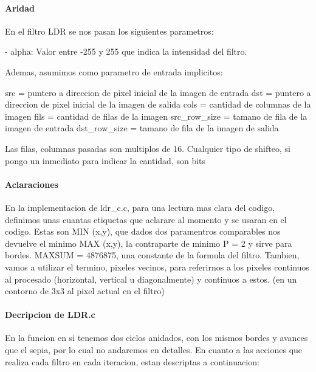 \documentclass[a4paper]{article}
\begin{document}
\paragraph{\textbf{Aridad}}
\hfill \break
En el filtro LDR se nos pasan los siguientes parametros:

- alpha: Valor entre -255 y 255 que indica la intensidad del filtro.

Ademas, asumimos como parametro de entrada implicitos:

src = puntero a direccion de pixel inicial de la imagen de entrada
\hfill \break
dst = puntero a direccion de pixel inicial de la imagen de salida
\hfill \break
cols = cantidad de columnas de la imagen
fils = cantidad de filas de la imagen
src_row_size = tamano de fila de la imagen de entrada
dst_row_size = tamano de fila de la imagen de salida 

Las filas, columnas pasadas son multiplos de 16. Cualquier tipo de shifteo, si pongo un inmediato para indicar la cantidad, son bits
 \paragraph{\textbf{Aclaraciones}}
\hfill \break	


	En la implementacion de ldr_c.c, para una lectura mas clara del codigo, definimos unas cuantas etiquetas que aclarare al momento y se usaran en el codigo. Estas son
	\hfill \break	
	MIN (x,y),  que dados dos paramentros comparables nos devuelve el minimo
	\hfill \break	
	MAX (x,y), la contraparte de minimo
	\hfill \break	
	P =  2 y sirve para bordes.
	\hfill \break	
	MAXSUM = 4876875, una constante de la formula del filtro.
	\hfill \break	
	Tambien, vamos a utilizar el termino, pixeles vecinos, para referirnos a los pixeles continuos al procesado (horizontal, vertical u diagonalmente) y  continuos a estos. (en un contorno de 3x3 al pixel actual en el filtro)   
	\hfill \break	
\paragraph{\textbf{Decripcion de LDR.c}}
\hfill \break	 

	 En la funcion en si tenemos dos ciclos anidados, con los mismos bordes y avances que el sepia, por lo cual no andaremos en detalles. 
	En cuanto a las acciones que realiza cada filtro en cada iteracion, estan descriptas a continuacion:
	\hfill \break	
	
\end{document}
